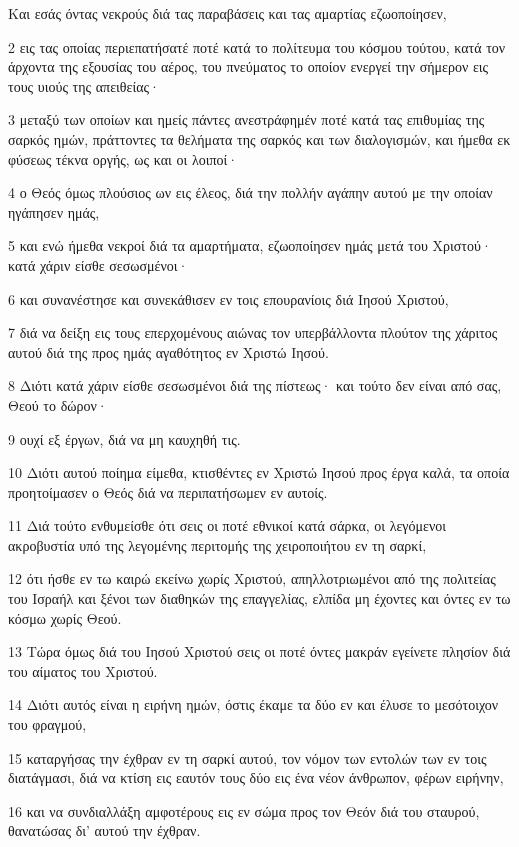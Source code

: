 \par Και εσάς όντας νεκρούς διά τας παραβάσεις και τας αμαρτίας εζωοποίησεν,
\par 2 εις τας οποίας περιεπατήσατέ ποτέ κατά το πολίτευμα του κόσμου τούτου, κατά τον άρχοντα της εξουσίας του αέρος, του πνεύματος το οποίον ενεργεί την σήμερον εις τους υιούς της απειθείας·
\par 3 μεταξύ των οποίων και ημείς πάντες ανεστράφημέν ποτέ κατά τας επιθυμίας της σαρκός ημών, πράττοντες τα θελήματα της σαρκός και των διαλογισμών, και ήμεθα εκ φύσεως τέκνα οργής, ως και οι λοιποί·
\par 4 ο Θεός όμως πλούσιος ων εις έλεος, διά την πολλήν αγάπην αυτού με την οποίαν ηγάπησεν ημάς,
\par 5 και ενώ ήμεθα νεκροί διά τα αμαρτήματα, εζωοποίησεν ημάς μετά του Χριστού· κατά χάριν είσθε σεσωσμένοι·
\par 6 και συνανέστησε και συνεκάθισεν εν τοις επουρανίοις διά Ιησού Χριστού,
\par 7 διά να δείξη εις τους επερχομένους αιώνας τον υπερβάλλοντα πλούτον της χάριτος αυτού διά της προς ημάς αγαθότητος εν Χριστώ Ιησού.
\par 8 Διότι κατά χάριν είσθε σεσωσμένοι διά της πίστεως· και τούτο δεν είναι από σας, Θεού το δώρον·
\par 9 ουχί εξ έργων, διά να μη καυχηθή τις.
\par 10 Διότι αυτού ποίημα είμεθα, κτισθέντες εν Χριστώ Ιησού προς έργα καλά, τα οποία προητοίμασεν ο Θεός διά να περιπατήσωμεν εν αυτοίς.
\par 11 Διά τούτο ενθυμείσθε ότι σεις οι ποτέ εθνικοί κατά σάρκα, οι λεγόμενοι ακροβυστία υπό της λεγομένης περιτομής της χειροποιήτου εν τη σαρκί,
\par 12 ότι ήσθε εν τω καιρώ εκείνω χωρίς Χριστού, απηλλοτριωμένοι από της πολιτείας του Ισραήλ και ξένοι των διαθηκών της επαγγελίας, ελπίδα μη έχοντες και όντες εν τω κόσμω χωρίς Θεού.
\par 13 Τώρα όμως διά του Ιησού Χριστού σεις οι ποτέ όντες μακράν εγείνετε πλησίον διά του αίματος του Χριστού.
\par 14 Διότι αυτός είναι η ειρήνη ημών, όστις έκαμε τα δύο εν και έλυσε το μεσότοιχον του φραγμού,
\par 15 καταργήσας την έχθραν εν τη σαρκί αυτού, τον νόμον των εντολών των εν τοις διατάγμασι, διά να κτίση εις εαυτόν τους δύο εις ένα νέον άνθρωπον, φέρων ειρήνην,
\par 16 και να συνδιαλλάξη αμφοτέρους εις εν σώμα προς τον Θεόν διά του σταυρού, θανατώσας δι' αυτού την έχθραν.
